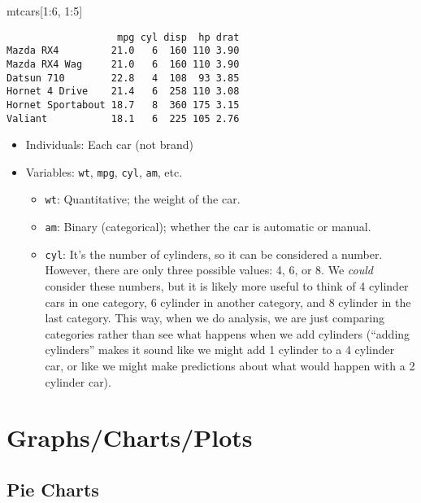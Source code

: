 \documentclass[
  letterpaper,
  DIV=11,
  numbers=noendperiod]{scrreprt}
\newenvironment{Shaded}{\begin{snugshade}}{\end{snugshade}}
\newcommand{\DecValTok}[1]{\textcolor[rgb]{0.68,0.00,0.00}{#1}}
\newcommand{\NormalTok}[1]{\textcolor[rgb]{0.00,0.23,0.31}{#1}}
\newcommand{\SpecialCharTok}[1]{\textcolor[rgb]{0.37,0.37,0.37}{#1}}
\providecommand{\tightlist}{%
  \setlength{\itemsep}{0pt}\setlength{\parskip}{0pt}}\usepackage{longtable,booktabs,array}
\begin{document}
\begin{Shaded}
\begin{Highlighting}[]
\NormalTok{mtcars[}\DecValTok{1}\SpecialCharTok{:}\DecValTok{6}\NormalTok{, }\DecValTok{1}\SpecialCharTok{:}\DecValTok{5}\NormalTok{]}
\end{Highlighting}
\end{Shaded}

\begin{verbatim}
                   mpg cyl disp  hp drat
Mazda RX4         21.0   6  160 110 3.90
Mazda RX4 Wag     21.0   6  160 110 3.90
Datsun 710        22.8   4  108  93 3.85
Hornet 4 Drive    21.4   6  258 110 3.08
Hornet Sportabout 18.7   8  360 175 3.15
Valiant           18.1   6  225 105 2.76
\end{verbatim}

\begin{itemize}
\tightlist
\item
  Individuals: Each car (not brand)
\item
  Variables: \texttt{wt}, \texttt{mpg}, \texttt{cyl}, \texttt{am}, etc.

  \begin{itemize}
  \tightlist
  \item
    \texttt{wt}: Quantitative; the weight of the car.
  \item
    \texttt{am}: Binary (categorical); whether the car is automatic or
    manual.
  \item
    \texttt{cyl}: It's the number of cylinders, so it can be considered
    a number. However, there are only three possible values: 4, 6, or 8.
    We \emph{could} consider these numbers, but it is likely more useful
    to think of 4 cylinder cars in one category, 6 cylinder in another
    category, and 8 cylinder in the last category. This way, when we do
    analysis, we are just comparing categories rather than see what
    happens when we add cylinders (``adding cylinders'' makes it sound
    like we might add 1 cylinder to a 4 cylinder car, or like we might
    make predictions about what would happen with a 2 cylinder car).
  \end{itemize}
\end{itemize}

\hypertarget{graphschartsplots}{%
\section{Graphs/Charts/Plots}\label{graphschartsplots}}

\hypertarget{pie-charts}{%
\subsection{Pie Charts}\label{pie-charts}}
\end{document}
